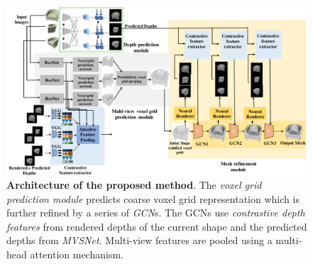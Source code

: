 \begin{figure}[t]
\begin{center}
\includegraphics[width=\linewidth]{imgs/meshrcnn_architecture.pdf}
\end{center}
    \caption{\textbf{Architecture of the proposed method}. The \emph{voxel grid prediction module} predicts coarse voxel grid representation which is further refined by a series of \emph{GCN}s. The GCNs use \emph{contrastive depth features} from rendered depths of the current shape and the predicted depths from \emph{MVSNet}. Multi-view features are pooled using a multi-head attention mechanism.}
\label{fig:system_architecture}
\end{figure}

